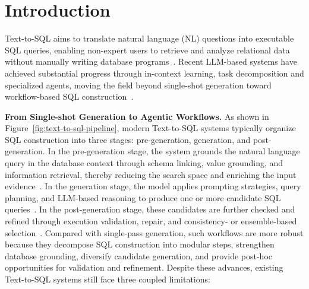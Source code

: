 \vspace{-2mm}
\section{Introduction}
\label{sec:intro}

Text-to-SQL aims to translate natural language (NL) questions into executable SQL queries, enabling non-expert users to retrieve and analyze relational data without manually writing database programs~\cite{androutsopoulos1995natural,hendrix1978developing,popescu2003towards}. 
Recent LLM-based systems have achieved substantial progress through in-context learning, task decomposition and specialized agents, moving the field beyond single-shot generation toward workflow-based SQL construction~\cite{gao2023text,pourreza2023din,wang2023mac,talaei2024chess}.


\textbf{From Single-shot Generation to Agentic Workflows.}
As shown in Figure~\ref{fig:text-to-sql-pipeline}, modern Text-to-SQL systems typically organize SQL construction into three stages: pre-generation, generation, and post-generation.
In the pre-generation stage, the system grounds the natural language query in the database context through schema linking, value grounding, and information retrieval, thereby reducing the search space and enriching the input evidence~\cite{talaei2024chess,lewis2020retrieval,pham2026avsql,biswal2026agentsm}. 
In the generation stage, the model applies prompting strategies, query planning, and LLM-based reasoning to produce one or more candidate SQL queries~\cite{gao2023text,pourreza2023din,wang2023mac,chaturvedi2025sqlthought,heidari2025agentiql,yang2025marssql}. 
In the post-generation stage, these candidates are further checked and refined through execution validation, repair, and consistency- or ensemble-based selection~\cite{wang2022selfconsistency,pourreza2023din,yao2023react,wang2023mac,talaei2024chess,chaturvedi2025sqlthought,heidari2025agentiql,yang2025marssql}.
Compared with single-pass generation, such workflows are more robust because they decompose SQL construction into modular steps, strengthen database grounding, diversify candidate generation, and provide post-hoc opportunities for validation and refinement. 
%
Despite these advances, existing Text-to-SQL systems still face three coupled limitations:

